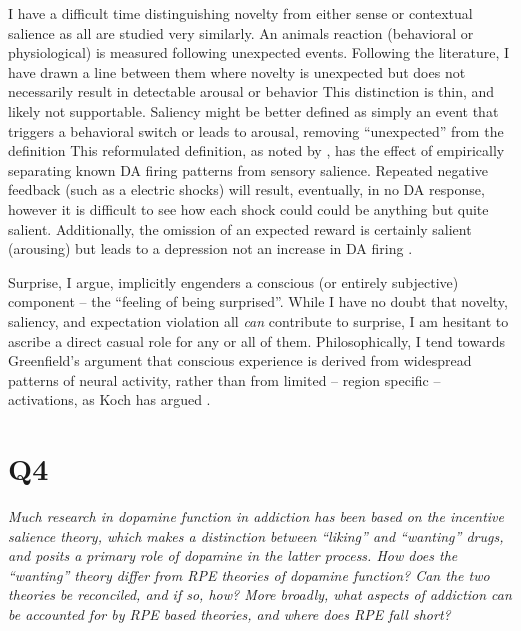 \documentclass[doc]{apa}        %
\begin{document}
I have a difficult time distinguishing novelty from either sense or contextual salience as all are studied very similarly. An animals reaction (behavioral or physiological) is measured following unexpected events.  Following the literature, I have drawn a line between them where novelty is unexpected but does not necessarily result in detectable arousal or behavior  This distinction is thin, and likely not supportable.  Saliency might be better defined as simply an event that triggers a behavioral switch or leads to arousal, removing ``unexpected'' from the definition  This reformulated definition, as noted by , has the effect of empirically separating known DA firing patterns from sensory salience.  Repeated negative feedback (such as a electric shocks) will result, eventually, in no DA response, however it is difficult to see how each shock could could be anything but quite salient.  Additionally, the omission of an expected reward is certainly salient (arousing) but leads to a depression not an increase in DA firing \cite{ODoherty:2004p2581,Fiorillo:2003p6375}.  
 
Surprise, I argue, implicitly engenders a conscious (or entirely subjective) component -- the ``feeling of being surprised''.  While I have no doubt that novelty, saliency, and expectation violation all \emph{can} contribute to surprise, I am hesitant to ascribe a direct casual role for any or all of them.  Philosophically, I tend towards Greenfield's argument that conscious experience is derived from widespread patterns of neural activity, rather than from limited -- region specific -- activations, as Koch has argued \cite{Koch:2007p7251}.  
  

\newpage
\section{Q4} %
\label{sec:q4}
\emph{Much research in dopamine function in addiction has been based on the incentive salience theory, which makes a distinction between “liking” and “wanting” drugs, and posits a primary role of dopamine in the latter process.  How does the “wanting” theory differ from RPE theories of dopamine function?  Can the two theories be reconciled, and if so, how?  More broadly, what aspects of addiction can be accounted for by RPE based theories, and where does RPE fall short? }
\end{document}
